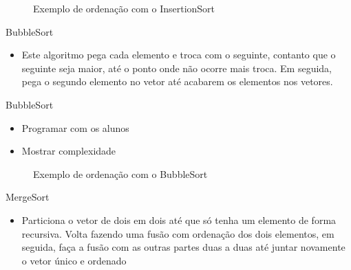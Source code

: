 \begin{frame}{}
	\begin{figure}[h!]
		\centering    
		  \caption{Exemplo de ordenação com o InsertionSort \cite{GEEKS_2018}}
	 \end{figure} 
\end{frame}

\begin{frame}
	\begin{block}{BubbleSort}
		\begin{itemize}
			\item Este algoritmo pega cada elemento e troca com o seguinte, contanto que o seguinte seja maior, até o ponto onde não ocorre mais troca. Em seguida, pega o segundo elemento no vetor até acabarem os elementos nos vetores.
		\end{itemize}
	\end{block}
\end{frame}

\begin{frame}
	\begin{block}{BubbleSort}
		\begin{itemize}
			\item Programar com os alunos
			\item Mostrar complexidade
		\end{itemize}
	\end{block}
\end{frame}

\begin{frame}{}
	\begin{figure}[h!]
		\centering    
		  \caption{Exemplo de ordenação com o BubbleSort \cite{GEEKS_2018}}
	 \end{figure} 
\end{frame}

\begin{frame}
	\begin{block}{MergeSort}
		\begin{itemize}
			\item Particiona o vetor de dois em dois até que só tenha um elemento de forma recursiva. Volta fazendo uma fusão com ordenação dos dois elementos, em seguida, faça a fusão com as outras partes duas a duas até juntar novamente o vetor único e ordenado
		\end{itemize}
	\end{block}
\end{frame}

